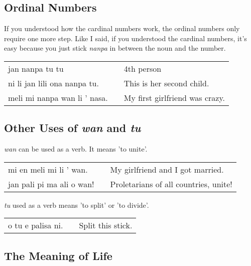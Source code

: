 \subsection*{Ordinal Numbers}
%
If you understood how the cardinal numbers work, the ordinal numbers only require one more step. 
Like I said, if you understood the cardinal numbers, it's easy because you just stick \textit{nanpa} in between the noun and the number. 

\begin{supertabular}{p{5,5cm}|ll}
jan nanpa tu tu && 4th person \\
ni li jan lili ona nanpa tu. && This is her second child. \\
meli mi nanpa wan li ' nasa. && My first girlfriend was crazy. \\
\end{supertabular} 
%
\subsection*{Other Uses of \textit{wan} and \textit{tu}}
%
\textit{wan} can be used as a verb. 
It means 'to unite'. 

\begin{supertabular}{p{5,5cm}|ll}
mi en meli mi li ' wan. && My girlfriend and I got married. \\
jan pali pi ma ali o wan! && Proletarians of all countries, unite! \\

\end{supertabular} 

\textit{tu} used as a verb means 'to split' or 'to divide'. 

\begin{supertabular}{p{5,5cm}|ll}
o tu e palisa ni. && Split this stick.  \\
\end{supertabular} 

\subsection*{The Meaning of Life}


